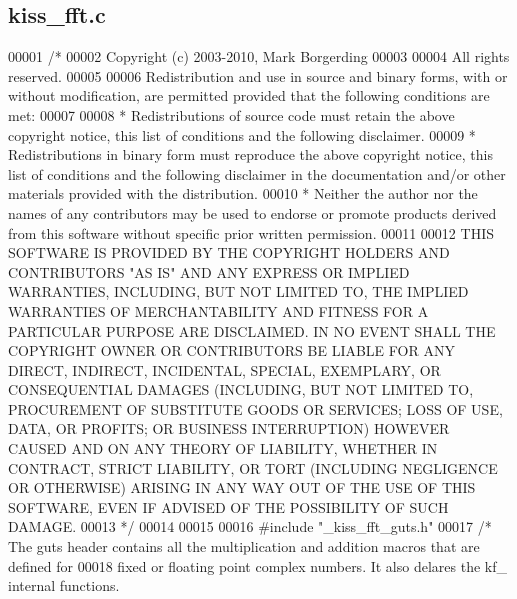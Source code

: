 \subsection{kiss\+\_\+fft.\+c}
\label{kiss__fft_8c_source}

\begin{DoxyCode}
00001 \textcolor{comment}{/*}
00002 \textcolor{comment}{Copyright (c) 2003-2010, Mark Borgerding}
00003 \textcolor{comment}{}
00004 \textcolor{comment}{All rights reserved.}
00005 \textcolor{comment}{}
00006 \textcolor{comment}{Redistribution and use in source and binary forms, with or without modification, are permitted provided
       that the following conditions are met:}
00007 \textcolor{comment}{}
00008 \textcolor{comment}{    * Redistributions of source code must retain the above copyright notice, this list of conditions and
       the following disclaimer.}
00009 \textcolor{comment}{    * Redistributions in binary form must reproduce the above copyright notice, this list of conditions and
       the following disclaimer in the documentation and/or other materials provided with the distribution.}
00010 \textcolor{comment}{    * Neither the author nor the names of any contributors may be used to endorse or promote products
       derived from this software without specific prior written permission.}
00011 \textcolor{comment}{}
00012 \textcolor{comment}{THIS SOFTWARE IS PROVIDED BY THE COPYRIGHT HOLDERS AND CONTRIBUTORS "AS IS" AND ANY EXPRESS OR IMPLIED
       WARRANTIES, INCLUDING, BUT NOT LIMITED TO, THE IMPLIED WARRANTIES OF MERCHANTABILITY AND FITNESS FOR A
       PARTICULAR PURPOSE ARE DISCLAIMED. IN NO EVENT SHALL THE COPYRIGHT OWNER OR CONTRIBUTORS BE LIABLE FOR ANY DIRECT,
       INDIRECT, INCIDENTAL, SPECIAL, EXEMPLARY, OR CONSEQUENTIAL DAMAGES (INCLUDING, BUT NOT LIMITED TO, PROCUREMENT
       OF SUBSTITUTE GOODS OR SERVICES; LOSS OF USE, DATA, OR PROFITS; OR BUSINESS INTERRUPTION) HOWEVER CAUSED
       AND ON ANY THEORY OF LIABILITY, WHETHER IN CONTRACT, STRICT LIABILITY, OR TORT (INCLUDING NEGLIGENCE OR
       OTHERWISE) ARISING IN ANY WAY OUT OF THE USE OF THIS SOFTWARE, EVEN IF ADVISED OF THE POSSIBILITY OF SUCH DAMAGE.}
00013 \textcolor{comment}{*/}
00014 
00015 
00016 \textcolor{preprocessor}{#include "_kiss_fft_guts.h"}
00017 \textcolor{comment}{/* The guts header contains all the multiplication and addition macros that are defined for}
00018 \textcolor{comment}{ fixed or floating point complex numbers.  It also delares the kf\_ internal functions.}

\end{DoxyCode}
